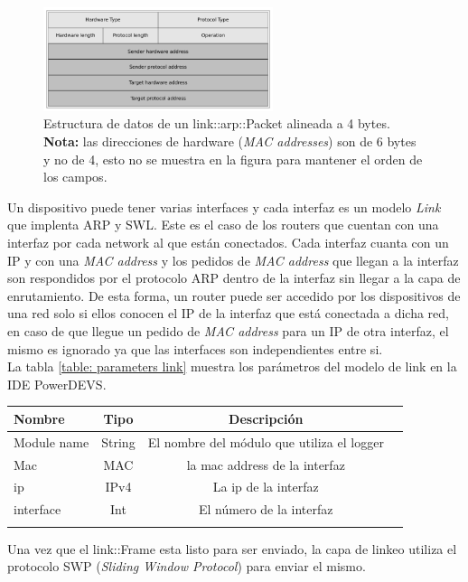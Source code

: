 \documentclass[10pt,a4paper]{article}
\begin{document}
\begin{figure}[!htb]
    \centering
    \includegraphics[width = 0.6\textwidth]{img/png/arp-packet.png}
    \caption{Estructura de datos de un link::arp::Packet alineada a 4 bytes. \textbf{Nota:} las direcciones de hardware (\textit{MAC addresses}) son de 6 bytes y no de 4, esto no se muestra en la figura para mantener el orden de los campos.}
    \label{figure: arp packet}
\end{figure}


Un dispositivo puede tener varias interfaces y cada interfaz es un modelo \textit{Link} que implenta ARP y SWL. Este es el caso de los routers que cuentan con una interfaz por cada network al que están conectados. Cada interfaz cuanta con un IP y con una \textit{MAC address} y los pedidos de \textit{MAC address} que llegan a la interfaz son respondidos por el protocolo ARP dentro de la interfaz sin llegar a la capa de enrutamiento. De esta forma, un router puede ser accedido por los dispositivos de una red solo si ellos conocen el IP de la interfaz que está conectada a dicha red, en caso de que llegue un pedido de \textit{MAC address} para un IP de otra interfaz, el mismo es ignorado ya que las interfaces son independientes entre si. \\

La tabla \ref{table: parameters link} muestra los parámetros del modelo de link en la IDE PowerDEVS.

\begin{tabular}{|l|c|c|c|}
  \hline
  Nombre & Tipo & Descripción \\
  \hline
  Module name & String & El nombre del módulo que utiliza el logger \\
  \hline
  Mac & MAC & la mac address de la interfaz \\
  \hline
  ip & IPv4 & La ip de la interfaz \\
  \hline
  interface & Int & El número de la interfaz \\
  \hline
  \label{table: parameters link}
  \caption{Parametros del modelo Link}
\end{tabular}

Una vez que el link::Frame esta listo para ser enviado, la capa de linkeo utiliza el protocolo SWP (\textit{Sliding Window Protocol}) para enviar el mismo. \\
\end{document}
